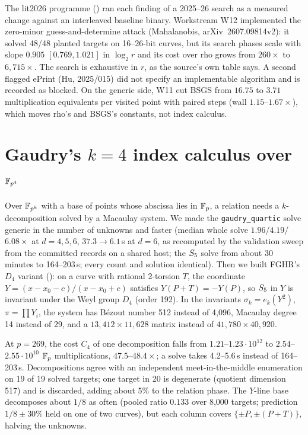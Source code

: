 The lit2026 programme () ran each
finding of a 2025--26 search as a measured change against an interleaved
baseline binary. Workstream W12 implemented the zero-minor
guess-and-determine attack (Mahalanobis, arXiv~2607.09814v2): it solved
48/48 planted targets on 16--26-bit curves, but its search phases scale
with slope $0.905$ $[0.769,1.021]$ in $\log_2 r$ and its cost over rho
grows from $260\times$ to $6{,}715\times$. The search is exhaustive in $r$, as the
source's own table says. A second flagged ePrint (Hu, 2025/015) did not
specify an implementable algorithm and is recorded as blocked. On the
generic side, W11 cut BSGS from $16.75$ to $3.71$ multiplication
equivalents per visited point with paired steps (wall $1.15$--$1.67\times$),
which moves rho's and BSGS's constants, not index calculus.

\section{Gaudry's $k=4$ index calculus over $\mathbb{F}_{p^4}$}\label{sec:gaudry}

Over $\mathbb{F}_{p^k}$ with a base of points whose abscissa lies in $\mathbb{F}_p$, a
relation needs a $k$-decomposition solved by a Macaulay system. We made the
\texttt{gaudry\_quartic} solve generic in the number of unknowns and faster
(median whole solve $1.96$/$4.19$/$6.08\times$ at $d=4,5,6$, $37.3\to6.1$\,s
at $d=6$, as recomputed by the validation sweep from the committed records
on a shared host; the $S_{5}$ solve from about 30 minutes to 164--203\,s;
every count and solution identical). Then we built FGHR's $D_4$ variant
(): on a curve with rational
2-torsion $T$, the coordinate $Y=(x-x_0-c)/(x-x_0+c)$ satisfies
$Y(P+T)=-Y(P)$, so $S_{5}$ in $Y$ is invariant under the Weyl group $D_4$
(order 192). In the invariants $\sigma_k=e_k(Y^2)$, $\pi=\prod Y_i$, the
system has B\'ezout number 512 instead of 4{,}096, Macaulay degree 14
instead of 29, and a $13{,}412\times11{,}628$ matrix instead of
$41{,}780\times40{,}920$.

At $p=269$, the cost $C_4$ of one decomposition falls from
$1.21$--$1.23\cdot10^{12}$ to $2.54$--$2.55\cdot10^{10}$ $\mathbb{F}_p$
multiplications, $47.5$--$48.4\times$; a solve takes 4.2--5.6\,s instead of
164--203\,s. Decompositions agree with an independent meet-in-the-middle
enumeration on 19 of 19 solved targets; one target in 20 is degenerate
(quotient dimension 517) and is discarded, adding about 5\% to the
relation phase. The $Y$-line base decomposes about $1/8$ as often (pooled
ratio $0.133$ over 8{,}000 targets; prediction $1/8\pm30\%$ held on one of
two curves), but each column covers $\{\pm P,\pm(P+T)\}$, halving the
unknowns.

